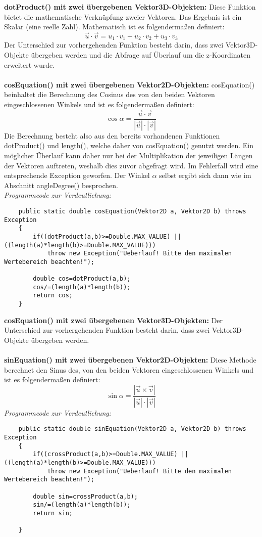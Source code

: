 \documentclass[a4paper,11pt]{scrartcl}
\begin{document}
\textbf{dotProduct() mit zwei übergebenen Vektor3D-Objekten:} Diese Funktion bietet die mathematische Verknüpfung zweier Vektoren. Das Ergebnis ist ein Skalar (eine reelle Zahl).
Mathematisch ist es folgendermaßen definiert:
\[ \vec u \cdot \vec v = u_1 \cdot v_1 + u_2 \cdot v_2 + u_3 \cdot v_3\]
Der Unterschied zur vorhergehenden Funktion besteht darin, dass zwei Vektor3D-Objekte übergeben werden und die Abfrage auf Überlauf um die z-Koordinaten erweitert wurde.\\
\\
\textbf{cosEquation() mit zwei übergebenen Vektor2D-Objekten:} cosEquation() beinhaltet die Berechnung des Cosinus des von den beiden Vektoren eingeschlossenen Winkels und ist es folgendermaßen definiert:
\[ \cos \alpha = \frac{\vec u \cdot \vec v}{| \vec  u | \cdot | \vec  v | } \]
Die Berechnung besteht also aus den bereits vorhandenen Funktionen dotProduct() und length(), welche daher von cosEquation() genutzt werden. Ein möglicher Überlauf kann daher nur bei der Multiplikation der jeweiligen Längen der Vektoren auftreten, weshalb dies zuvor abgefragt wird. Im Fehlerfall wird eine entsprechende Exception geworfen.
Der Winkel $\alpha$ selbst ergibt sich dann wie im Abschnitt angleDegree() besprochen.\\
\textit{Programmcode zur Verdeutlichung:}
\begin{lstlisting}
	public static double cosEquation(Vektor2D a, Vektor2D b) throws Exception
	{
		if((dotProduct(a,b)>=Double.MAX_VALUE) || ((length(a)*length(b)>=Double.MAX_VALUE)))
			throw new Exception("Ueberlauf! Bitte den maximalen Wertebereich beachten!");
		
		double cos=dotProduct(a,b);
		cos/=(length(a)*length(b));
		return cos;
	}
\end{lstlisting} $\;$ \\
\textbf{cosEquation() mit zwei übergebenen Vektor3D-Objekten:} Der Unterschied zur vorhergehenden Funktion besteht darin, dass zwei Vektor3D-Objekte übergeben werden.\\
\\
\textbf{sinEquation() mit zwei übergebenen Vektor2D-Objekten:} Diese Methode berechnet den Sinus des, von den beiden Vektoren eingeschlossenen Winkels und ist es folgendermaßen definiert:
\[ \sin \alpha = \frac{ | \vec u \times \vec v | }{| \vec  u | \cdot | \vec  v | } \]
\textit{Programmcode zur Verdeutlichung:}
\begin{lstlisting}
	public static double sinEquation(Vektor2D a, Vektor2D b) throws Exception
	{
		if((crossProduct(a,b)>=Double.MAX_VALUE) || ((length(a)*length(b)>=Double.MAX_VALUE)))
			throw new Exception("Ueberlauf! Bitte den maximalen Wertebereich beachten!");
		
		double sin=crossProduct(a,b);
		sin/=(length(a)*length(b));
		return sin; 

	}
\end{lstlisting}
\end{document}

